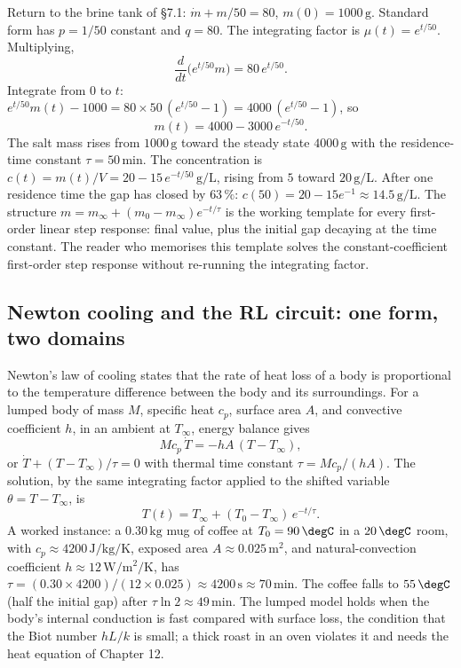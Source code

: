 Return to the brine tank of \S7.1: $\dot{m} + m/50 = 80$,
$m(0) = 1000\,\si{\gram}$. Standard form has $p = 1/50$ constant and
$q = 80$. The integrating factor is $\mu(t) = e^{t/50}$. Multiplying,
\[
\frac{d}{dt}\bigl(e^{t/50} m\bigr) = 80\, e^{t/50}.
\]
Integrate from $0$ to $t$: $e^{t/50} m(t) - 1000 = 80 \times 50
\,(e^{t/50} - 1) = 4000\,(e^{t/50} - 1)$, so
\[
m(t) = 4000 - 3000\, e^{-t/50}.
\]
The salt mass rises from $1000\,\si{\gram}$ toward the steady state
$4000\,\si{\gram}$ with the residence-time constant
$\tau = 50\,\si{\minute}$. The concentration is $c(t) = m(t)/V =
20 - 15\, e^{-t/50}\,\si{\gram\per\liter}$, rising from
$5$ toward $20\,\si{\gram\per\liter}$. After one residence time the
gap has closed by $63\,\%$: $c(50) = 20 - 15 e^{-1} \approx
14.5\,\si{\gram\per\liter}$. The structure $m = m_{\infty} +
(m_{0} - m_{\infty}) e^{-t/\tau}$ is the working template for every
first-order linear step response: final value, plus the initial gap
decaying at the time constant. The reader who memorises this template
solves the constant-coefficient first-order step response without
re-running the integrating factor.

\subsection{Newton cooling and the RL circuit: one form, two domains}

Newton's law of cooling states that the rate of heat loss of a body
is proportional to the temperature difference between the body and
its surroundings. For a lumped body of mass $M$, specific heat
$c_{p}$, surface area $A$, and convective coefficient $h$, in an
ambient at $T_{\infty}$, energy balance gives
\[
M c_{p}\, \dot{T} = -h A\,(T - T_{\infty}),
\]
or $\dot{T} + (T - T_{\infty})/\tau = 0$ with thermal time constant
$\tau = M c_{p}/(h A)$. The solution, by the same integrating factor
applied to the shifted variable $\theta = T - T_{\infty}$, is
\[
T(t) = T_{\infty} + (T_{0} - T_{\infty})\, e^{-t/\tau}.
\]
A worked instance: a $0.30\,\si{\kilogram}$ mug of coffee at
$T_{0} = 90\,\degC$ in a $20\,\degC$ room, with $c_{p} \approx
4200\,\si{\joule\per\kilogram\per\kelvin}$, exposed area
$A \approx 0.025\,\si{\meter\squared}$, and natural-convection
coefficient $h \approx 12\,\si{\watt\per\meter\squared\per\kelvin}$,
has $\tau = (0.30 \times 4200)/(12 \times 0.025) \approx
4200\,\si{\second} \approx 70\,\si{\minute}$. The coffee falls to
$55\,\degC$ (half the initial gap) after $\tau \ln 2 \approx
49\,\si{\minute}$. The lumped model holds when the body's internal
conduction is fast compared with surface loss, the condition that the
Biot number $hL/k$ is small; a thick roast in an oven violates it and
needs the heat equation of Chapter 12.

